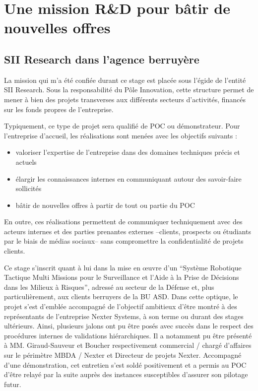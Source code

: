 \section{Une mission R\&D pour b\^{a}tir de nouvelles offres}

\subsection{SII Research dans l'agence berruyère}

La mission qui m'a été confiée durant ce stage est placée sous l'égide de l'entité SII Research. 
Sous la responsabilité du Pôle Innovation, cette structure permet de mener à bien des projets transverses aux différents secteurs d'activités, financés sur les fonds propres de l'entreprise.  

Typiquement, ce type de projet sera qualifié de \gls{POC} ou démonstrateur. Pour l'entreprise d'accueil, les réalisations sont menées avec les objectifs suivants : 

\begin{itemize}
  \item valoriser l'expertise de l'entreprise dans des domaines techniques précis et actuels
  \item élargir les connaissances internes en communiquant autour des savoir-faire sollicités
  \item bâtir de nouvelles offres à partir de tout ou partie du \gls{POC} 
\end{itemize}

En outre, ces réalisations permettent de communiquer techniquement avec des acteurs internes et des parties prenantes externes --clients, prospects ou étudiants par le biais de médias sociaux-- sans compromettre la confidentialité 
de projets clients. 

Ce stage s'inscrit quant à lui dans la mise en \oe{}uvre d’un ``Système Robotique Tactique Multi Missions pour le Surveillance et l’Aide à la Prise de Décisions dans les Milieux à Risques'', adressé au secteur de la Défense 
et, plus particulièrement, aux clients berruyers de la \gls{BU} \gls{ASD}.
Dans cette optique, le projet s'est d'emblée accompagné de l'objectif ambitieux d'être montré à des représentants de l'entreprise Nexter Systems, à son terme ou durant des stages ultérieurs.  
Ainsi, plusieurs jalons ont pu être posés avec succès dans le respect des procédures internes de validations hiérarchiques. 
Il a notamment pu être présenté à MM. Giraud-Sauveur et Boucher respectivement commercial / chargé d'affaires sur le périmètre MBDA / Nexter et Directeur de projets Nexter. 
Accompagné d'une démonstration, cet entretien s'est soldé positivement et a permis au \gls{POC} d'être relayé par la suite auprès des instances susceptibles d'assurer son pilotage futur.  

